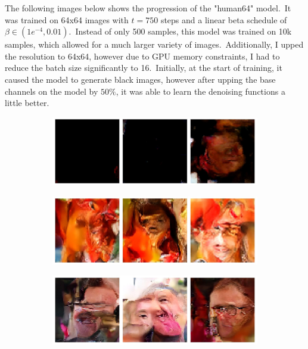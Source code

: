 \documentclass[12pt]{article}
\begin{document}
The following images below shows the progression of the "human64" model.\
It was trained on 64x64 images with $t=750$ steps and a linear beta schedule of $\beta \in(1e^{-4}, 0.01)$.\
Instead of only 500 samples, this model was trained on 10k samples, which allowed for a much larger variety of images.\
Additionally, I upped the resolution to 64x64, however due to GPU memory constraints, I had to reduce the batch size significantly to 16.\
Initially, at the start of training, it caused the model to generate black images, however after upping the base channels on the model by $50\%$, it was able to learn the denoising functions a little better.\

\begin{figure}[H]
  \centering
  \begin{subfigure}{0.5\textwidth}
    \includegraphics[width=1\textwidth]{human5k.jpg}
  \end{subfigure}%
  \begin{subfigure}{0.5\textwidth}
    \includegraphics[width=1\textwidth]{human10k.jpg}
  \end{subfigure}
  \begin{subfigure}{0.5\textwidth}
    \includegraphics[width=1\textwidth]{human20k.jpg}

\end{subfigure}
\end{figure}
\end{document}
